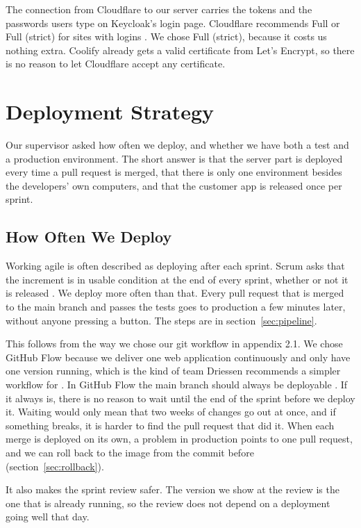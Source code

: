 \documentclass[a4paper,11pt]{article}
\begin{document}
The connection from Cloudflare to our server carries the tokens and the passwords users type on Keycloak's login page. Cloudflare recommends Full or Full (strict) for sites with logins \cite{cloudflare-ssl-flexible}. We chose Full (strict), because it costs us nothing extra. Coolify already gets a valid certificate from Let's Encrypt, so there is no reason to let Cloudflare accept any certificate.

\section{Deployment Strategy}\label{sec:strategy}
Our supervisor asked how often we deploy, and whether we have both a test and a production environment. The short answer is that the server part is deployed every time a pull request is merged, that there is only one environment besides the developers' own computers, and that the customer app is released once per sprint.

\subsection{How Often We Deploy}
Working agile is often described as deploying after each sprint. Scrum asks that the increment is in usable condition at the end of every sprint, whether or not it is released \cite[p.~15]{schwaber-scrum-guide-2016}. We deploy more often than that. Every pull request that is merged to the main branch and passes the tests goes to production a few minutes later, without anyone pressing a button. The steps are in section~\ref{sec:pipeline}.

This follows from the way we chose our git workflow in appendix 2.1. We chose GitHub Flow because we deliver one web application continuously and only have one version running, which is the kind of team Driessen recommends a simpler workflow for \cite{driessen-git-branching-model}. In GitHub Flow the main branch should always be deployable \cite{chacon-github-flow-2011}. If it always is, there is no reason to wait until the end of the sprint before we deploy it. Waiting would only mean that two weeks of changes go out at once, and if something breaks, it is harder to find the pull request that did it. When each merge is deployed on its own, a problem in production points to one pull request, and we can roll back to the image from the commit before (section~\ref{sec:rollback}).

It also makes the sprint review safer. The version we show at the review is the one that is already running, so the review does not depend on a deployment going well that day.
\end{document}

